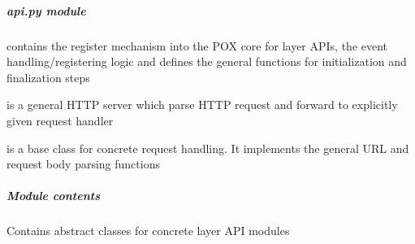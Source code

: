 \documentclass[letterpaper,10pt,english]{sphinxmanual}
\begin{document}
\subparagraph{\emph{api.py} module}
\label{util/api:api-py-module}\label{util/api::doc}
{\hyperref[util/api:escape.util.api.AbstractAPI]{\emph{}}} contains the register mechanism into the POX core for
layer APIs, the event handling/registering logic and defines the general
functions for initialization and finalization steps

{\hyperref[util/api:escape.util.api.RESTServer]{\emph{}}} is a general HTTP server which parse HTTP request and
forward to explicitly given request handler

{\hyperref[util/api:escape.util.api.AbstractRequestHandler]{\emph{}}} is a base class for concrete request handling.
It implements the general URL and request body parsing functions


\subparagraph{Module contents}
\label{util/api:module-contents}\label{util/api:module-escape.util.api}
Contains abstract classes for concrete layer API modules
\end{document}
